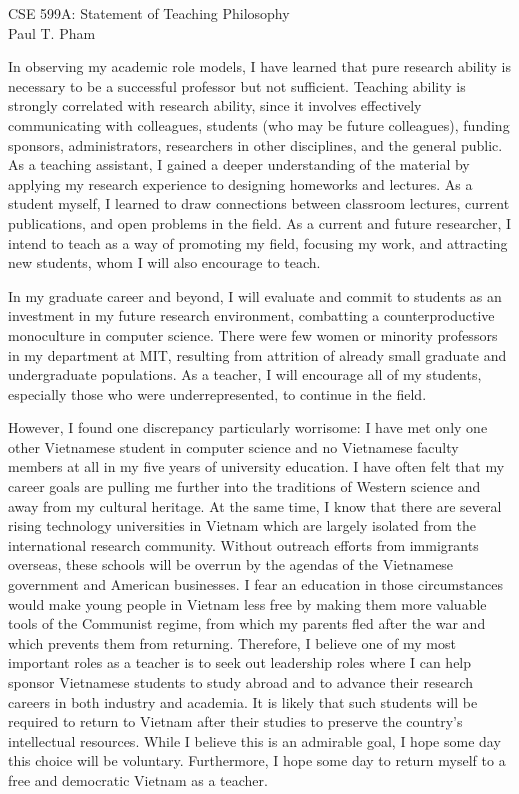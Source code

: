 \documentclass{article}
\begin{document}
\begin{center}
\Large{CSE 599A: Statement of Teaching Philosophy}\\
\vspace{0.4\baselineskip}
\large{Paul T. Pham}
\end{center}

In observing my academic role models, I have learned that pure
research ability is necessary to be a successful professor but not
sufficient.  Teaching ability is strongly correlated with research
ability, since it involves effectively communicating with colleagues,
students (who may be future colleagues), funding sponsors,
administrators, researchers in other disciplines, and the general
public. As a teaching assistant, I gained a deeper understanding of
the material by applying my research experience to designing homeworks
and lectures.  As a student myself, I learned to draw connections
between classroom lectures, current publications, and open problems in
the field.  As a current and future researcher, I intend to teach as a
way of promoting my field, focusing my work, and attracting new
students, whom I will also encourage to teach.

In my graduate career and beyond, I will evaluate and commit to
students as an investment in my future research environment,
combatting a counterproductive monoculture in computer science. There
were few women or minority professors in my department at MIT,
resulting from attrition of already small graduate and undergraduate
populations.  As a teacher, I will encourage all of my students,
especially those who were underrepresented, to continue in the field.

However, I found one discrepancy particularly worrisome: I have met only one
other Vietnamese student in computer science and no Vietnamese faculty
members at all in my five years of university education.  I have often
felt that my career goals are pulling me further into the traditions
of Western science and away from my cultural heritage.  At the same
time, I know that there are several rising technology universities in
Vietnam which are largely isolated from the international research
community. Without outreach efforts from immigrants overseas, these
schools will be overrun by the agendas of the Vietnamese
government and American businesses.
I fear an education in those
circumstances would make young people in Vietnam less free by making
them more valuable tools of the Communist regime, from which my parents
fled after the war and which prevents them from returning.
Therefore, I believe one of my most important roles as a teacher is to
seek out leadership roles where I can help sponsor
Vietnamese students to study abroad and to advance their research
careers in both industry and academia. It is likely that such students
will be required to return to Vietnam after their studies to preserve
the country's intellectual resources. While I believe this is an
admirable goal, I hope some day this choice will be voluntary. Furthermore,
I hope some day to return myself to a free and democratic Vietnam as a
teacher.
\end{document}
